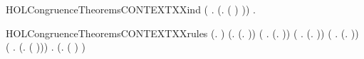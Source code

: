 \begin{SaveVerbatim}{HOLCongruenceTheoremsCONTEXTXXind}
       (\HOLSymConst{\HOLTokenForall{}} .   \HOLSymConst{\HOLTokenImp{}}  (\HOLTokenLambda{}.  ( ) )) \HOLSymConst{\HOLTokenImp{}}
       \HOLSymConst{\HOLTokenForall{}}.   \HOLSymConst{\HOLTokenImp{}}  
\end{SaveVerbatim}
\newcommand{\HOLCongruenceTheoremsCONTEXTXXind}{\UseVerbatim{HOLCongruenceTheoremsCONTEXTXXind}}
\begin{SaveVerbatim}{HOLCongruenceTheoremsCONTEXTXXrules}
\HOLTokenTurnstile{}  (\HOLTokenLambda{}. ) \HOLSymConst{\HOLTokenConj{}} (\HOLSymConst{\HOLTokenForall{}}.  (\HOLTokenLambda{}. )) \HOLSymConst{\HOLTokenConj{}}
   (\HOLSymConst{\HOLTokenForall{}} .   \HOLSymConst{\HOLTokenImp{}}  (\HOLTokenLambda{}.  )) \HOLSymConst{\HOLTokenConj{}}
   (\HOLSymConst{\HOLTokenForall{}} .   \HOLSymConst{\HOLTokenConj{}}   \HOLSymConst{\HOLTokenImp{}}  (\HOLTokenLambda{}.   \HOLSymConst{+}  )) \HOLSymConst{\HOLTokenConj{}}
   (\HOLSymConst{\HOLTokenForall{}} .   \HOLSymConst{\HOLTokenConj{}}   \HOLSymConst{\HOLTokenImp{}}  (\HOLTokenLambda{}.   \HOLSymConst{\ensuremath{\parallel}}  )) \HOLSymConst{\HOLTokenConj{}}
   (\HOLSymConst{\HOLTokenForall{}} .   \HOLSymConst{\HOLTokenImp{}}  (\HOLTokenLambda{}. \HOLConst{\ensuremath{\nu}}  ( ))) \HOLSymConst{\HOLTokenConj{}}
   \HOLSymConst{\HOLTokenForall{}} .   \HOLSymConst{\HOLTokenImp{}}  (\HOLTokenLambda{}.  ( ) )
\end{SaveVerbatim}
